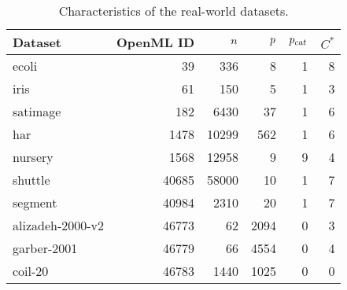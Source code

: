 \begin{table}[h]
    \caption{Characteristics of the real-world datasets.}
    \label{tab:datasets}
    \vskip 0.1in
    \begin{center}
    \begin{scriptsize}
    \begin{sc}
\begin{tabular}{lrrrrr}
\toprule
Dataset & OpenML ID & $n$ & $p$ & $p_{cat}$ & $C^*$ \\
\midrule
ecoli & 39 & 336 & 8 & 1 & 8 \\
iris & 61 & 150 & 5 & 1 & 3 \\
satimage & 182 & 6430 & 37 & 1 & 6 \\
har & 1478 & 10299 & 562 & 1 & 6 \\
nursery & 1568 & 12958 & 9 & 9 & 4 \\
shuttle & 40685 & 58000 & 10 & 1 & 7 \\
segment & 40984 & 2310 & 20 & 1 & 7 \\
alizadeh-2000-v2 & 46773 & 62 & 2094 & 0 & 3 \\
garber-2001 & 46779 & 66 & 4554 & 0 & 4 \\
coil-20 & 46783 & 1440 & 1025 & 0 & 0 \\
\bottomrule
\end{tabular}
    \end{sc}
    \end{scriptsize}
    \end{center}
    \vskip -0.15in
\end{table}

